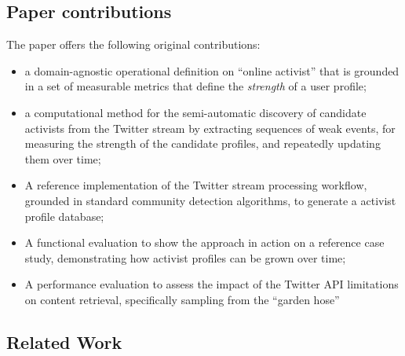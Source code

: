 \documentclass[runningheads]{llncs}
\begin{document}



\subsection{Paper contributions}


The paper offers the following original contributions:

\begin{itemize}
\item a domain-agnostic operational definition on ``online activist'' that is grounded in a set of measurable metrics that define the \textit{strength} of a user profile;

\item a computational method for the semi-automatic discovery of candidate activists from the Twitter stream by extracting sequences of weak events, for measuring the strength of the candidate profiles, and repeatedly updating them over time;

\item A reference implementation of the Twitter stream processing workflow, grounded in standard community detection algorithms, to generate a activist profile database;

\item A functional evaluation to show the approach in action on a reference case study, demonstrating how activist profiles can be grown over time;

\item A performance evaluation to assess the impact of the Twitter API limitations on content retrieval, specifically sampling from the ``garden hose'' 

\end{itemize}


\subsection{Related Work}
\end{document}
